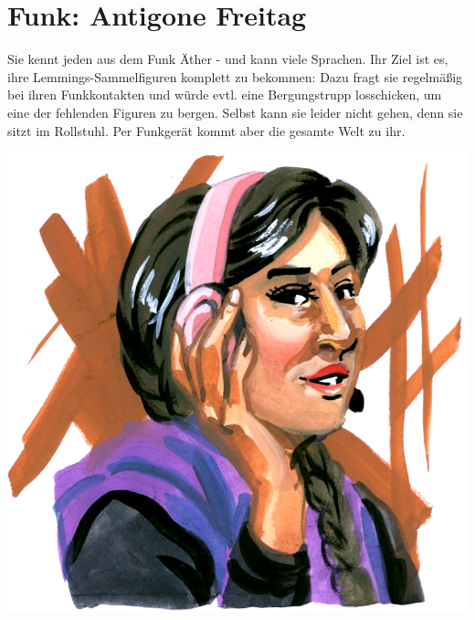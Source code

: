 \newpage

\section{Funk: Antigone Freitag}

Sie kennt jeden aus dem Funk Äther - und kann viele Sprachen. Ihr Ziel ist es, ihre Lemmings-Sammelfiguren komplett zu bekommen: Dazu fragt sie regelmäßig bei ihren Funkkontakten und würde evtl. eine Bergungstrupp losschicken, um eine der fehlenden Figuren zu bergen. Selbst kann sie leider nicht gehen, denn sie sitzt im Rollstuhl. Per Funkgerät kommt aber die gesamte Welt zu ihr.

\begin{center}
    \includegraphics[scale=0.4]{portraits/Flohmarkt_Antigone.png}
\end{center}


